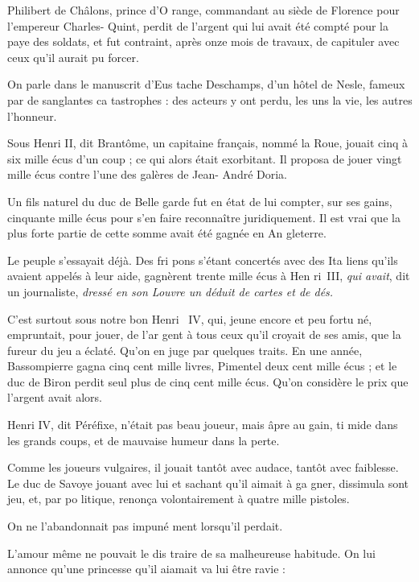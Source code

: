 Philibert de Châlons, prince d'O%
range, commandant au siède de
Florence pour l'empereur Charles-%
Quint, perdit de l'argent qui lui avait
été compté pour la paye des soldats,
et fut contraint, après onze mois de
travaux, de capituler avec ceux qu'il
aurait pu forcer.

On parle dans le manuscrit d'Eus%
tache Deschamps, d'un hôtel de
Nesle, fameux par de sanglantes ca%
tastrophes : des acteurs y ont perdu,
les uns la vie, les autres l'honneur.

Sous Henri II, dit Brantôme, un
capitaine français, nommé la Roue,
jouait cinq à six mille écus d'un
coup ; ce qui alors était exorbitant.
Il proposa de jouer vingt mille écus
contre l'une des galères de Jean-%
André Doria.

Un fils naturel du duc de Belle\-%
garde fut en état de lui compter, sur
ses gains, cinquante mille écus pour
s'en faire reconnaître juridiquement.
Il est vrai que la plus forte partie de
cette somme avait été gagnée en An%
gleterre.

Le peuple s'essayait déjà. Des fri%
pons s'étant concertés avec des Ita%
liens qu'ils avaient appelés à leur aide,
gagnèrent trente mille écus à Hen%
ri~III, \emph{qui avait}, dit un journaliste,
\emph{dressé en son Louvre un déduit de
cartes et de dés.}

C'est surtout sous notre bon Henri~
IV, qui, jeune encore et peu fortu%
né, empruntait, pour jouer, de l'ar%
gent à tous ceux qu'il croyait de ses
amis, que la fureur du jeu a éclaté.
Qu'on en juge par quelques traits. En
une année, Bassompierre gagna cinq
cent mille livres, Pimentel deux cent
mille écus ; et le duc de Biron perdit
seul plus de cinq cent mille écus.
Qu'on considère le prix que l'argent
avait alors.

Henri IV, dit Péréfixe, n'était pas
beau joueur, mais âpre au gain, ti%
mide dans les grands coups, et de
mauvaise humeur dans la perte.

Comme les joueurs vulgaires, il
jouait tantôt avec audace, tantôt avec
faiblesse. Le duc de Savoye jouant
avec lui et sachant qu'il aimait à ga%
gner, dissimula sont jeu, et, par po%
litique, renonça volontairement à
quatre mille pistoles.

On ne l'abandonnait pas impuné%
ment lorsqu'il perdait.

L'amour même ne pouvait le dis%
traire de sa malheureuse habitude.
On lui annonce qu'une princesse
qu'il aiamait va lui être ravie : 

